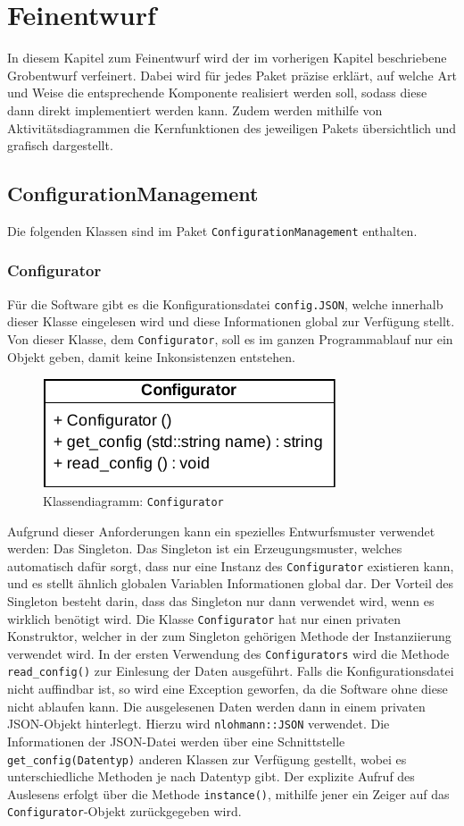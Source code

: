 \documentclass[../review_3.tex]{subfiles}
\begin{document}
\chapter{Feinentwurf}\thispagestyle{fancy}
In diesem Kapitel zum Feinentwurf wird der im vorherigen Kapitel beschriebene Grobentwurf verfeinert. Dabei wird für jedes Paket präzise erklärt, auf welche Art und Weise die entsprechende Komponente realisiert werden soll, sodass diese dann direkt implementiert werden kann. Zudem werden mithilfe von Aktivitätsdiagrammen die Kernfunktionen des jeweiligen Pakets übersichtlich und grafisch dargestellt.

\section{ConfigurationManagement}
Die folgenden Klassen sind im Paket \texttt{ConfigurationManagement} enthalten.

\subsection{Configurator}
Für die Software gibt es die Konfigurationsdatei \texttt{config.JSON}, welche innerhalb dieser Klasse eingelesen wird und diese Informationen global zur Verfügung stellt. Von dieser Klasse, dem \texttt{Configurator}, soll es im ganzen Programmablauf nur ein Objekt geben, damit keine Inkonsistenzen entstehen.
\begin{figure}[H]
    \centering
    \includegraphics[width=0.4\linewidth]{img/Configurator.pdf}
    \caption{Klassendiagramm: \texttt{Configurator}}
    \label{Class_Configurator}
\end{figure}
Aufgrund dieser Anforderungen kann ein spezielles Entwurfsmuster verwendet werden: Das Singleton. Das Singleton ist ein Erzeugungsmuster, welches automatisch dafür sorgt, dass nur eine Instanz des \texttt{Configurator} existieren kann, und es stellt ähnlich globalen Variablen Informationen global dar. Der Vorteil des Singleton besteht darin, dass das Singleton nur dann verwendet wird, wenn es wirklich benötigt wird. Die Klasse \texttt{Configurator} hat nur einen privaten Konstruktor, welcher in der zum Singleton gehörigen Methode der Instanziierung verwendet wird. In der ersten Verwendung des \texttt{Configurators} wird die Methode \texttt{read\_config()} zur Einlesung der Daten ausgeführt. Falls die Konfigurationsdatei nicht auffindbar ist, so wird eine Exception geworfen, da die Software ohne diese nicht ablaufen kann. Die ausgelesenen Daten werden dann in einem privaten JSON-Objekt hinterlegt. Hierzu wird \texttt{nlohmann::JSON} verwendet. Die Informationen der JSON-Datei werden über eine Schnittstelle \texttt{get\_config(Datentyp)} anderen Klassen zur Verfügung gestellt, wobei es unterschiedliche Methoden je nach Datentyp gibt. Der explizite Aufruf des Auslesens erfolgt über die Methode \texttt{instance()}, mithilfe jener ein Zeiger auf das \texttt{Configurator}-Objekt zurückgegeben wird.
\end{document}
